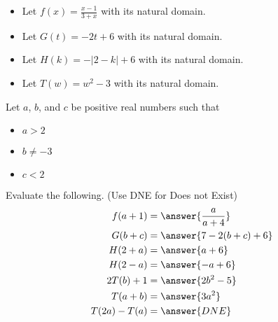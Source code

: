 \documentclass{ximera}
\author{Lee Wayand}
\begin{document}
\begin{exercise}



\begin{itemize}
\item Let $f(x) = \frac{x-1}{3 + x}$ with its natural domain. \\
\item Let $G(t) = -2t + 6$ with its natural domain. \\
\item Let $H(k) =  -|2-k|+6$ with its natural domain. \\
\item Let $T(w) = w^2 - 3$ with its natural domain. \\
\end{itemize}

Let $a$, $b$, and $c$ be positive real numbers such that 

\begin{itemize}
\item $a > 2$ 
\item $b \ne -3$
\item $c < 2$
\end{itemize}


Evaluate the following.  (Use DNE for Does not Exist) \\






\begin{align*}
f(a + 1)   &=  \answer{\frac{a}{a+4}} \\
G(b+c)   &=  \answer{7-2(b+c)+6} \\
H(2+a)    &=  \answer{a+6} \\
H(2-a)    &=  \answer{-a+6} \\
2 T(b) + 1   &=  \answer{2 b^2 - 5} \\
T(a+b) &=  \answer{3 a^2}  \\
T(2a) - T(a)  &=  \answer{DNE}
\end{align*}







\end{exercise}
\end{document}
